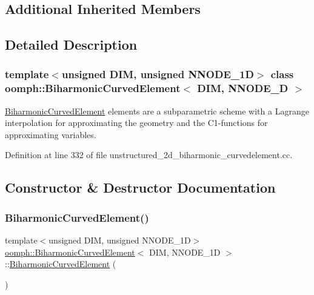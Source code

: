 \subsection*{Additional Inherited Members}


\subsection{Detailed Description}
\subsubsection*{template$<$unsigned D\+IM, unsigned N\+N\+O\+D\+E\+\_\+1D$>$\newline
class oomph\+::\+Biharmonic\+Curved\+Element$<$ D\+I\+M, N\+N\+O\+D\+E\+\_\+D $>$}

\hyperlink{classoomph_1_1BiharmonicCurvedElement}{Biharmonic\+Curved\+Element} elements are a subparametric scheme with a Lagrange interpolation for approximating the geometry and the C1-\/functions for approximating variables. 

Definition at line 332 of file unstructured\+\_\+2d\+\_\+biharmonic\+\_\+curvedelement.\+cc.



\subsection{Constructor \& Destructor Documentation}
\mbox{\label{classoomph_1_1BiharmonicCurvedElement_a29bf3b21c60da246d8bc9abfd0e91bf5}} 
\subsubsection{\texorpdfstring{Biharmonic\+Curved\+Element()}{BiharmonicCurvedElement()}\hspace{0.1cm}{\footnotesize\ttfamily [1/2]}}
{\footnotesize\ttfamily template$<$unsigned D\+IM, unsigned N\+N\+O\+D\+E\+\_\+1D$>$ \\
\hyperlink{classoomph_1_1BiharmonicCurvedElement}{oomph\+::\+Biharmonic\+Curved\+Element}$<$ D\+IM, N\+N\+O\+D\+E\+\_\+1D $>$\+::\hyperlink{classoomph_1_1BiharmonicCurvedElement}{Biharmonic\+Curved\+Element} (\begin{DoxyParamCaption}{ }\end{DoxyParamCaption})\hspace{0.3cm}{\ttfamily [inline]}}



